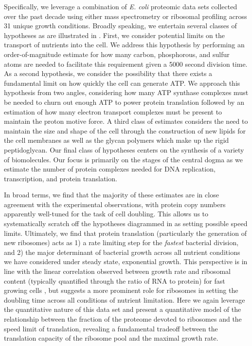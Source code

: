 Specifically, we leverage a combination of \textit{E. coli} proteomic data
sets collected over the past decade using either mass spectrometry
\citep{schmidt2016,peebo2015, valgepea2013} or ribosomal profiling
\citep{li2014} across 31 unique growth conditions. Broadly speaking, we
entertain several classes of hypotheses as are illustrated in
. First, we consider potential limits on the transport of
nutrients into the cell. We address this hypothesis by performing an
order-of-magnitude estimate for how many carbon, phosphorous, and sulfur
atoms are needed to facilitate this requirement given a 5000 second division
time. As a second hypothesis, we consider the possibility that there exists a
fundamental limit on how quickly the cell can generate ATP. We approach this
hypothesis from two angles, considering how many ATP synthase complexes must
be needed to churn out enough ATP to power protein translation followed by an
estimation of how many electron transport complexes must be present to
maintain the proton motive force. A third class of estimates considers the
need to maintain the size and shape of the cell through the construction of
new lipids for the cell membranes as well as the glycan polymers which make
up the rigid peptidoglycan. Our final class of hypotheses centers on the
synthesis of a variety of biomolecules. Our focus is primarily on the stages
of the central dogma as we estimate the number of protein complexes needed
for DNA replication, transcription, and protein translation.

In broad terms, we find that the majority of these estimates are in close
agreement with the experimental observations, with
protein copy numbers apparently well-tuned for the task of cell doubling. This
allows us to systematically scratch off the hypotheses diagrammed in
 as setting possible speed limits. Ultimately, we find that
protein translation (particularly the generation of new ribosomes) acts as 1) a
rate limiting step for the \textit{fastest} bacterial division, and 2) the major
determinant of bacterial growth across all nutrient conditions we have
considered under steady state, exponential growth. This perspective is in line
with the linear correlation observed between growth rate and ribosomal content
(typically quantified through the ratio of RNA to protein) for fast growing cells
\citep{scott2010}, but suggests a more prominent role for ribosomes in setting
the doubling time across all conditions of nutrient limitation. Here we
again leverage the quantitative nature of this data set and present a
quantitative model of the relationship between the fraction of the proteome
devoted to ribosomes and the speed limit of translation, revealing a fundamental
tradeoff between the translation capacity of the ribosome pool and the maximal
growth rate.

